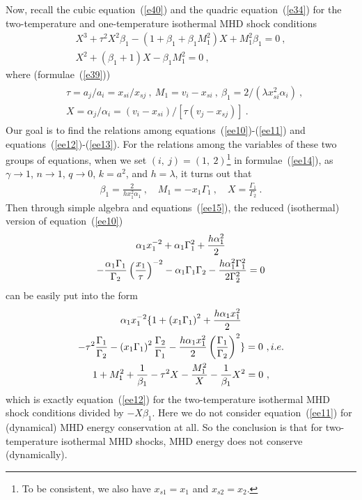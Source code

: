 \documentclass[fleqn,usenatbib]{mnras}
\begin{document}
Now, recall the cubic equation~(\ref{e40}) and the quadric equation~(\ref{e34}) for the two-temperature and one-temperature isothermal MHD shock conditions
\begin{gather}
X^{3}+\tau^{2}X^{2}\beta_{1}-\left(1+\beta_{1}+\beta_{1}M_{1}^{2}\right)X+M_{1}^{2}\beta_{1}=0\ ,\label{ee12}\\
X^{2}+\left(\beta_{1}+1\right)X-\beta_{1}M_{1}^{2}=0\ ,\label{ee13}
\end{gather}
where (formulae~(\ref{e39}))
\begin{gather}
\begin{split}
&\tau=a_{j}/a_{i}=x_{si}/x_{sj}\ ,
\ M_{1}=v_{i}-x_{si}\ ,
\ \beta_{1}=2/(\lambda x^{2}_{si}\alpha_{i})\ ,\\
&X=\alpha_{j}/\alpha_{i}=(v_{i}-x_{si})/[\tau (v_{j}-x_{sj})]\ .
\end{split}\label{ee14}
\end{gather}
Our goal is to find the relations among equations~(\ref{ee10})-(\ref{ee11}) and equations~(\ref{ee12})-(\ref{ee13}). For the relations among the variables of these two groups of equations, when we set $(i,\ j)=(1,\ 2)$\footnote{To be consistent, we also have $x_{s1}=x_{1}$ and $x_{s2}=x_{2}$.} in formulae~(\ref{ee14}), as $\gamma\rightarrow 1$, $n\rightarrow 1$, $q\rightarrow 0$, $k=a^{2}$, and $h=\lambda$, it turns out that
\begin{gather}
\beta_{1}=\frac{2}{hx_{1}^{2}\alpha_{1}}\ ,\quad M_{1}=-x_{1}\Gamma_{1}\ ,\quad X=\frac{\Gamma_{1}}{\Gamma_{2}}\ .\label{ee15}
\end{gather}
Then through simple algebra and equations~(\ref{ee15}), the reduced (isothermal) version of equation~(\ref{ee10})
\begin{gather}
\alpha_{1}x_{1}^{-2}+\alpha_{1}\Gamma_{1}^{2}+\frac{h\alpha_{1}^{2}}{2}\notag\\
-\frac{\alpha_{1}\Gamma_{1}}{\Gamma_{2}}\left(\frac{x_{1}}{\tau}\right)^{-2}-\alpha_{1}\Gamma_{1}\Gamma_{2}-\frac{h\alpha_{1}^{2}\Gamma_{1}^{2}}{2\Gamma_{2}^{2}}=0 \label{ee16}
\end{gather}
can be easily put into the form
\begin{gather}
\alpha_{1}x_{1}^{-2}\lbrace 1+\left(x_{1}\Gamma_{1}\right)^{2}+\frac{h\alpha_{1}x_{1}^{2}}{2}\notag\\
-\tau^{2}\frac{\Gamma_{1}}{\Gamma_{2}}-\left(x_{1}\Gamma_{1}\right)^{2}\frac{\Gamma_{2}}{\Gamma_{1}}-\frac{h\alpha_{1}x_{1}^{2}}{2}\left(\frac{\Gamma_{1}}{\Gamma_{2}}\right)^{2}\rbrace=0\ ,i.e.\notag\\
1+M_{1}^{2}+\frac{1}{\beta_{1}}-\tau^{2}X-\frac{M_{1}^{2}}{X}-\frac{1}{\beta_{1}}X^{2}=0\ ,\label{ee17}
\end{gather}
which is exactly equation~(\ref{ee12}) for the two-temperature isothermal MHD shock conditions divided by $-X\beta_{1}$. Here we do not consider equation~(\ref{ee11}) for (dynamical) MHD energy conservation at all. So the conclusion is that for two-temperature isothermal MHD shocks, MHD energy does not conserve (dynamically).
\end{document}
